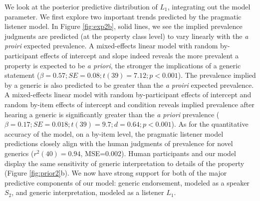 \documentclass[12pt,letterpaper]{article}
\newcommand{\mht}[1]{\textcolor{Blue}{[mht: #1]}}
\begin{document}
We look at the posterior predictive distribution of $L_1$, integrating out the model parameter.
We first explore two important trends predicted by the pragmatic listener model.
In Figure \ref{fig:exp2b}, solid lines, we see the implied prevalence judgments are predicted (at the property class level) to vary linearly with the \emph{a proiri} expected prevalence. 
A mixed-effects linear model with random by-participant effects of intercept and slope indeed reveals the more prevalent a property is expected to be \emph{a priori}, the stronger the implications of a generic statement ($\beta = 0.57; SE = 0.08; t(39) = 7.12; p < 0.001$).
The prevalence implied by a generic is also predicted to be greater than the \emph{a proiri} expected prevalence.
A mixed-effects linear model with random by-participant effects of intercept and random by-item effects of intercept and condition reveals implied prevalence after hearing a generic is significantly greater than the \emph{a priori} prevalence ($\beta = 0.17; SE = 0.018; t(39) = 9.7; d = 0.64; p < 0.001$).
As for the quantitative accuracy of the model, on a by-item level, the pragmatic listener model predictions closely align with the human judgments of prevalence for novel generics ($r^2(40)=0.94$, MSE=0.002).
Human participants and our model display the same sensitivity of generic interpretation to details of the property (Figure \ref{fig:prior2}b). 
We now have strong support for both of the major predictive components of our model: generic endorsement, modeled as a speaker $S_2$, and generic interpretation, modeled as a listener $L_1$.

\end{document}
